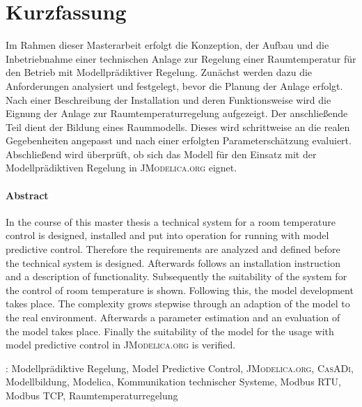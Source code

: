 %
%

\chapter*{Kurzfassung}
\thispagestyle{empty}
Im Rahmen dieser Masterarbeit erfolgt die Konzeption, der Aufbau und die Inbetriebnahme einer technischen Anlage zur Regelung einer Raumtemperatur für den Betrieb mit Modellprädiktiver Regelung. Zunächst werden dazu die Anforderungen analysiert und festgelegt, bevor die Planung der Anlage erfolgt. Nach einer Beschreibung der Installation und deren Funktionsweise wird die Eignung der Anlage zur Raumtemperaturregelung aufgezeigt. Der anschließende Teil dient der Bildung eines Raummodells. Dieses wird schrittweise an die realen Gegebenheiten angepasst und nach einer erfolgten Parameterschätzung evaluiert. Abschließend wird überprüft, ob sich das Modell für den Einsatz mit der Modellprädiktiven Regelung in \textsc{JModelica.org} eignet.

\subsubsection*{Abstract}
In the course of this master thesis a technical system for a room temperature control is designed, installed and put into operation for running with model predictive control. Therefore the requirements are analyzed and defined before the technical system is designed. Afterwards follows an installation instruction and a description of functionality. Subsequently the suitability of the system for the control of room temperature is shown. Following this, the model development takes place. The complexity grows stepwise through an adaption of the model to the real environment. Afterwards a parameter estimation and an evaluation of the model takes place. Finally the suitability of the model for the usage with model predictive control in \textsc{JModelica.org} is verified.\vspace{8\baselineskip}

{\normalsize
{}:  Modellprädiktive Regelung, Model Predictive Control, \textsc{JModelica.org}, \textsc{CasADi}, Modellbildung, Modelica, Kommunikation technischer Systeme, Modbus RTU, Modbus TCP, Raumtemperaturregelung
}

